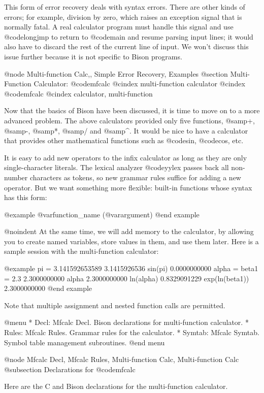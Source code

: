 {{{{{{{{{{This form of error recovery deals with syntax errors.  There are other
kinds of errors; for example, division by zero, which raises an exception
signal that is normally fatal.  A real calculator program must handle this
signal and use @code{longjmp} to return to @code{main} and resume parsing
input lines; it would also have to discard the rest of the current line of
input.  We won't discuss this issue further because it is not specific to
Bison programs.

@node Multi-function Calc,, Simple Error Recovery, Examples
@section Multi-Function Calculator: @code{mfcalc}
@cindex multi-function calculator
@cindex @code{mfcalc}
@cindex calculator, multi-function

Now that the basics of Bison have been discussed, it is time to move on to
a more advanced problem.  The above calculators provided only five
functions, @samp{+}, @samp{-}, @samp{*}, @samp{/} and @samp{^}.  It would
be nice to have a calculator that provides other mathematical functions such
as @code{sin}, @code{cos}, etc.

It is easy to add new operators to the infix calculator as long as they are
only single-character literals.  The lexical analyzer @code{yylex} passes
back all non-number characters as tokens, so new grammar rules suffice for
adding a new operator.  But we want something more flexible: built-in
functions whose syntax has this form:

@example
@var{function_name} (@var{argument})
@end example

@noindent
At the same time, we will add memory to the calculator, by allowing you
to create named variables, store values in them, and use them later.
Here is a sample session with the multi-function calculator:

@example
pi = 3.141592653589
3.1415926536
sin(pi)
0.0000000000
alpha = beta1 = 2.3
2.3000000000
alpha
2.3000000000
ln(alpha)
0.8329091229
exp(ln(beta1))
2.3000000000
%
@end example

Note that multiple assignment and nested function calls are permitted.

@menu
* Decl: Mfcalc Decl.     Bison declarations for multi-function calculator.
* Rules: Mfcalc Rules.   Grammar rules for the calculator.
* Symtab: Mfcalc Symtab. Symbol table management subroutines.
@end menu

@node Mfcalc Decl, Mfcalc Rules, Multi-function Calc, Multi-function Calc
@subsection Declarations for @code{mfcalc}

Here are the C and Bison declarations for the multi-function calculator.

}}}}}}}}}}
